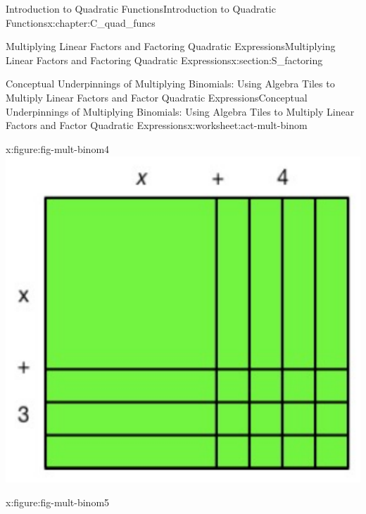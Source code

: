 \documentclass[oneside,10pt,]{book}
\numberwithin{equation}{chapter}
\begin{document}
\begin{chapterptx}{Introduction to Quadratic Functions}{}{Introduction to Quadratic Functions}{}{}{x:chapter:C_quad_funcs}
\begin{sectionptx}{Multiplying Linear Factors and Factoring Quadratic Expressions}{}{Multiplying Linear Factors and Factoring Quadratic Expressions}{}{}{x:section:S_factoring}
\begin{worksheet-subsection}{Conceptual Underpinnings of Multiplying Binomials: Using Algebra Tiles to Multiply Linear Factors and Factor Quadratic Expressions}{}{Conceptual Underpinnings of Multiplying Binomials: Using Algebra Tiles to Multiply Linear Factors and Factor Quadratic Expressions}{}{}{x:worksheet:act-mult-binom}
\begin{introduction}{}
\begin{sidebyside}{2}{0}{0}{0}
\begin{sbspanel}{0.5}
\begin{figureptx}{}{x:figure:fig-mult-binom4}{}
\includegraphics[width=\linewidth]{external/mult-binom4.pdf}
\tcblower
\end{figureptx}%
\end{sbspanel}%
\begin{sbspanel}{0.5}%
\begin{figureptx}{}{x:figure:fig-mult-binom5}{}%

\end{figureptx}
\end{sbspanel}
\end{sidebyside}
\end{introduction}
\end{worksheet-subsection}
\end{sectionptx}
\end{chapterptx}
\end{document}
